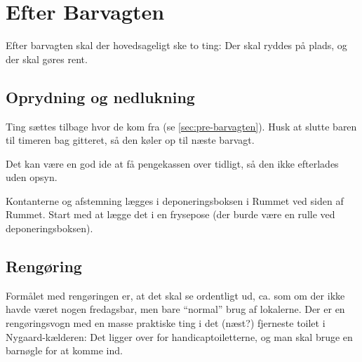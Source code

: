 \section{Efter Barvagten}
\label{sec:post-barvagten}

Efter barvagten skal der hovedsageligt ske to ting: Der skal ryddes på
plads, og der skal gøres rent.

\subsection{Oprydning og nedlukning}
\label{sec:post:oprydning}

Ting sættes tilbage hvor de kom fra (se
\autoref{sec:pre-barvagten}). Husk at slutte baren til timeren bag gitteret, så den
køler op til næste barvagt.

Det kan være en god ide at få
pengekassen over tidligt, så den ikke efterlades uden opsyn.

Kontanterne og afstemning lægges i deponeringsboksen i Rummet ved
siden af Rummet. Start med at lægge det i en frysepose (der burde være
en rulle ved deponeringsboksen).

\subsection{Rengøring}
\label{sec:post:rengoring}

Formålet med rengøringen er, at det skal se ordentligt ud, ca. som om
der ikke havde været nogen fredagsbar, men bare ``normal'' brug af
lokalerne. Der er en rengøringsvogn med en masse praktiske ting i det
(næst?) fjerneste toilet i Nygaard-kælderen: Det ligger over for
handicaptoiletterne, og man skal bruge en barnøgle for at komme ind.

